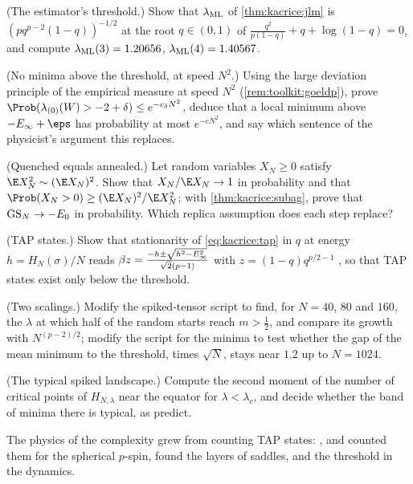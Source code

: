 \begin{refsection}
\begin{exercises}
\item \byhand (The estimator's threshold.) Show that $\lambda_{\mathrm{ML}}$ of \cref{thm:kacrice:jlm} is $(pq^{p-2}(1-q))^{-1/2}$ at the root $q\in(0,1)$ of $\frac{q^2}{p(1-q)}+q+\log(1-q)=0$, and compute $\lambda_{\mathrm{ML}}(3)=1.20656$, $\lambda_{\mathrm{ML}}(4)=1.40567$.\label{ex:kacrice:jlm}

\item \translate (No minima above the threshold, at speed $N^2$.) Using the large deviation principle of the empirical measure at speed $N^2$ (\cref{rem:toolkit:goeldp}), prove $\Prob(\lambda_{(0)}(W)>-2+\delta)\le e^{-c_\delta N^2}$, deduce that a local minimum above $-\kacriceinf+\eps$ has probability at most $e^{-cN^2}$, and say which sentence of the physicist's argument this replaces.\label{ex:kacrice:n2}

\item \translate (Quenched equals annealed.) Let random variables $X_N\ge0$ satisfy $\E X_N^2\sim(\E X_N)^2$. Show that $X_N/\E X_N\to1$ in probability and that $\Prob(X_N>0)\ge(\E X_N)^2/\E X_N^2$; with \cref{thm:kacrice:subag}, prove that $\mathrm{GS}_N\to-E_0$ in probability. Which replica assumption does each step replace?\label{ex:kacrice:second}

\item \translate (TAP states.) Show that stationarity of \eqref{eq:kacrice:tap} in $q$ at energy $h=H_N(\sigma)/N$ reads $\beta z=\frac{-h\pm\sqrt{h^2-E_\infty^2}}{\sqrt2(p-1)}$ with $z=(1-q)q^{p/2-1}$ \parencite[Section~6]{AuffingerBenArousCerny2013}, so that TAP states exist only below the threshold.\label{ex:kacrice:tap}

\item \measurement (Two scalings.) Modify the spiked-tensor script to find, for $N=40$, $80$ and $160$, the $\lambda$ at which half of the random starts reach $m>\frac12$, and compare its growth with $N^{(p-2)/2}$; modify the script for the minima to test whether the gap of the mean minimum to the threshold, times $\sqrt N$, stays near $1.2$ up to $N=1024$.\label{ex:kacrice:escape}

\item \research (The typical spiked landscape.) Compute the second moment of the number of critical points of $H_{N,\lambda}$ near the equator for $\lambda<\lambda_c$, and decide whether the band of minima there is typical, as \textcite{RosEtAl2019} predict.\label{ex:kacrice:research}
\end{exercises}

\notesandrefs
The physics of the complexity grew from counting TAP states: \textcite{KurchanParisiVirasoro1993}, \textcite{CrisantiSommers1995} and \textcite{CavagnaGiardinaParisi1998} counted them for the spherical $p$-spin, \textcite{KurchanLaloux1996} found the layers of saddles, and \textcite{CugliandoloKurchan1993} the threshold in the dynamics.


\end{refsection}
